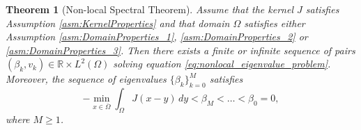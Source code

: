 \documentclass[12pt, a4paper]{article}
\theoremstyle{break}
\newtheorem{thm}{Theorem}[section]
\theoremstyle{break}
\theoremstyle{break}
\theoremstyle{break}
\theoremstyle{break}
\theoremstyle{break}
\theoremstyle{break}
\theoremstyle{break}
\theoremstyle{break}
\begin{document}
\begin{thm}[Non-local Spectral Theorem]
    \label{thm:spectral_theorem}
    Assume that the kernel $J$ satisfies Assumption \ref{asm:KernelProperties} and that domain $\Omega$ satisfies either Assumption \ref{asm:DomainProperties_1}, \ref{asm:DomainProperties_2} or \ref{asm:DomainProperties_3}. Then there exists a finite or infinite sequence of pairs $(\beta_k, v_k) \in \mathbb{R} \times L^2(\Omega)$ solving equation \eqref{eq:nonlocal_eigenvalue_problem}. Moreover, the sequence of eigenvalues $\{\beta_k\}_{k = 0}^M$ satisfies
    \begin{equation}
        -\min_{x \in \overline{\Omega}} \int_\Omega J(x-y) \, dy < \beta_M < \ldots < \beta_0 = 0,
    \end{equation}
    where $M \geq 1$.
\end{thm}
\end{document}
